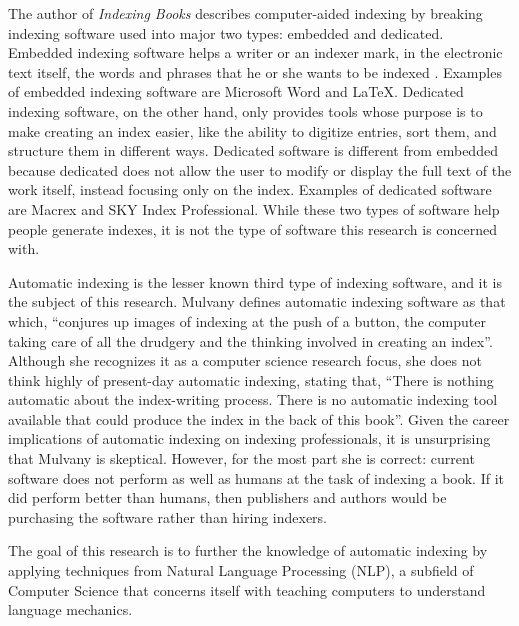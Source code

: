 The author of {\it Indexing Books} describes computer-aided indexing by breaking indexing software used into major two types: embedded and dedicated.
Embedded indexing software helps a writer or an indexer mark, in the electronic text itself, the words and phrases that he or she wants to be indexed \cite{mulvany}.
Examples of embedded indexing software are Microsoft Word \cite{ms-word-indexing} and \LaTeX \cite{lamport}.
Dedicated indexing software, on the other hand, only provides tools whose purpose is to make creating an index easier, like the ability to digitize entries, sort them, and structure them in different ways\cite{mulvany}.
Dedicated software is different from embedded because dedicated does not allow the user to modify or display the full text of the work itself, instead focusing only on the index.
Examples of dedicated software are Macrex\cite{macrex} and SKY Index Professional\cite{sky-software}.
While these two types of software help people generate indexes, it is not the type of software this research is concerned with.

Automatic indexing is the lesser known third type of indexing software, and it is the subject of this research.
Mulvany defines automatic indexing software as that which, ``conjures up images of indexing at the push of a button, the computer taking care of all the drudgery and the thinking involved in creating an index''\cite{mulvany}.
Although she recognizes it as a computer science research focus, she does not think highly of present-day automatic indexing, stating that, ``There is nothing automatic about the index-writing process.
There is no automatic indexing tool available that could produce the index in the back of this book''\cite{mulvany}.
Given the career implications of automatic indexing on indexing professionals, it is unsurprising that Mulvany is skeptical.
However, for the most part she is correct: current software does not perform as well as humans at the task of indexing a book.
If it did perform better than humans, then publishers and authors would be purchasing the software rather than hiring indexers.

The goal of this research is to further the knowledge of automatic indexing by applying techniques from Natural Language Processing (NLP), a subfield of Computer Science that concerns itself with teaching computers to understand language mechanics.
